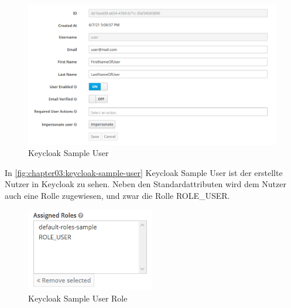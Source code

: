 \begin{figure}[htbp]
  \centering
  \includegraphics[width=1.0\textwidth]{gfx/keycloak-sample-user.PNG}
  \caption{Keycloak Sample User}
  \label{fig:chapter03:keycloak-sample-user}
 \end{figure}

In \autoref{fig:chapter03:keycloak-sample-user} Keycloak Sample User ist der erstellte Nutzer in Keycloak zu sehen. Neben 
den Standardattributen wird dem Nutzer auch eine Rolle zugewiesen, und zwar die Rolle ROLE\_USER.\bigskip

\begin{figure}[htbp]
  \centering
  \includegraphics[width=0.5\textwidth]{gfx/keycloak-sample-user-role.PNG}
  \caption{Keycloak Sample User Role}
  \label{fig:chapter03:keycloak-sample-user-role}
 \end{figure}

